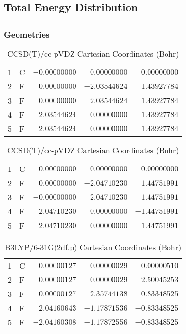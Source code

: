 \documentclass[10pt,oneside]{article}
\begin{document}
\begin{table}
\subsection*{Total Energy Distribution}
\centering\end{table}

\clearpage

\subsection{}

\begin{table}[h!]
\subsubsection*{Geometries}
\begin{multicols}{2}
\centering
\caption{CCSD(T)/cc-pVTZ Cartesian Coordinates (Bohr)}
\begin{tabular}{llrrr}
\toprule
1  & C  & $-0.00000000$ & $ 0.00000000$ & $ 0.00000000$ \\
2  & F  & $ 0.00000000$ & $-2.03544624$ & $ 1.43927784$ \\
3  & F  & $-0.00000000$ & $ 2.03544624$ & $ 1.43927784$ \\
4  & F  & $ 2.03544624$ & $ 0.00000000$ & $-1.43927784$ \\
5  & F  & $-2.03544624$ & $-0.00000000$ & $-1.43927784$ \\
\bottomrule
\end{tabular}
\caption{CCSD(T)/cc-pVDZ Cartesian Coordinates (Bohr)}
\begin{tabular}{llrrr}
\toprule
1  & C  & $-0.00000000$ & $ 0.00000000$ & $ 0.00000000$ \\
2  & F  & $ 0.00000000$ & $-2.04710230$ & $ 1.44751991$ \\
3  & F  & $-0.00000000$ & $ 2.04710230$ & $ 1.44751991$ \\
4  & F  & $ 2.04710230$ & $ 0.00000000$ & $-1.44751991$ \\
5  & F  & $-2.04710230$ & $-0.00000000$ & $-1.44751991$ \\
\bottomrule
\end{tabular}
\end{multicols}
\end{table}

\begin{table}[h]
\centering
\caption{B3LYP/6-31G(2df,p) Cartesian Coordinates (Bohr)}
\begin{tabular}{llrrr}
\toprule
1  & C  & $-0.00000127$ & $-0.00000029$ & $ 0.00000510$ \\
2  & F  & $-0.00000127$ & $-0.00000029$ & $ 2.50045253$ \\
3  & F  & $-0.00000127$ & $ 2.35744138$ & $-0.83348525$ \\
4  & F  & $ 2.04160643$ & $-1.17871536$ & $-0.83348525$ \\
5  & F  & $-2.04160308$ & $-1.17872556$ & $-0.83348525$ \\
\bottomrule
\end{tabular}
\end{table}
\end{document}
